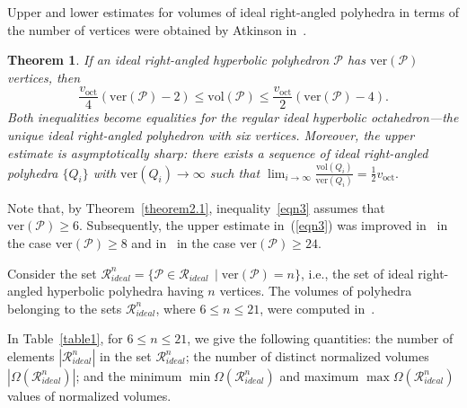 \documentclass{amsart}
\newtheorem{theorem}{Theorem}[section]
\newcommand{\vol}{\mathrm{vol}}
\newcommand{\voct}{v_{\mathrm{oct}}}
\newcommand{\ver}{\mathrm{ver}}
\begin{document}
Upper and lower estimates for volumes of ideal right-angled polyhedra in terms of the number of vertices were obtained by Atkinson in~\cite{At09}.

\begin{theorem} \cite[Theorem 2.2]{At09}  \label{theorem2.3}
If an ideal right-angled hyperbolic polyhedron $\mathcal P$ has $\ver(\mathcal P)$ vertices, then 
\begin{equation} \label{eqn3}
\frac{\voct}{4}(\ver(\mathcal P) - 2) \leq \vol(\mathcal P) \leq \frac{\voct}{2}(\ver(\mathcal P) - 4).
\end{equation}
Both inequalities become equalities for the regular ideal hyperbolic octahedron---the unique ideal right-angled polyhedron with six vertices.
Moreover, the upper estimate is asymptotically sharp: there exists a sequence of ideal right-angled polyhedra $\{Q_i\}$ with $\ver(Q_i) \to \infty$ such that 
$
\lim_{i \to \infty} \frac{\vol(Q_i)}{\ver(Q_i)} = \frac{1}{2} \voct.
$
\end{theorem}

Note that, by Theorem~\ref{theorem2.1}, inequality~\eqref{eqn3} assumes that $\ver(\mathcal P) \geq 6$. Subsequently, the upper estimate in~(\ref{eqn3}) was improved in~\cite{EV20-2} in the case $\ver(\mathcal P) \geq 8$ and in~\cite{ABEV} in the case $\ver(\mathcal P) \geq 24$.
	
Consider the set $\mathcal R^n_{ideal} = \{ \mathcal P \in \mathcal R_{ideal} \, \mid \ver(\mathcal P) = n\}$, i.e., the set of ideal right-angled hyperbolic polyhedra having $n$ vertices. The volumes of polyhedra belonging to the sets $\mathcal R^n_{ideal}$, where $6 \leq n \leq 21$, were computed in~\cite{VeEg}.

In Table~\ref{table1}, for $6 \leq n \leq 21$, we give the following quantities: the number of elements $| \mathcal R^n_{ideal}| $ in the set $\mathcal R^n_{ideal}$; the number of distinct normalized volumes $|\Omega(\mathcal R^n_{ideal})|$; and the minimum $\min \Omega(\mathcal R^n_{ideal})$ and maximum $\max \Omega(\mathcal R^n_{ideal})$ values of normalized volumes.
\end{document}
